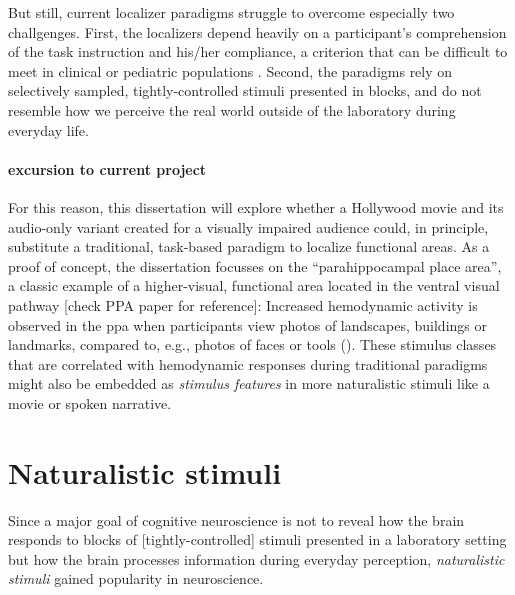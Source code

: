 But still, current localizer paradigms struggle to overcome especially two
challgenges.
%
First, the localizers depend heavily on a participant's comprehension of the
task instruction and his/her compliance, a criterion that can be difficult to
meet in clinical or pediatric populations \citep{eickhoff2020towards,
vanderwal2015inscapes, vanderwal2019movies}.
Second, the paradigms rely on selectively sampled, tightly-controlled stimuli
presented in blocks, and do not resemble how we perceive the real world outside
of the laboratory during everyday life.


\paragraph{excursion to current project}



%
For this reason, this dissertation will explore whether a Hollywood movie and
its audio-only variant created for a visually impaired audience could, in
principle, substitute a traditional, task-based paradigm to localize functional
areas.
%
As a proof of concept, the dissertation focusses on the ``parahippocampal place
area'', a classic example of a higher-visual, functional area
\citep{epstein1998ppa, epstein1999parahippocampal} located in the ventral visual
pathway [check PPA paper for reference]:
Increased hemodynamic activity is observed in the \ac{ppa} when participants
view photos of landscapes, buildings or landmarks, compared to, e.g., photos of
faces or tools (\citep[see reviews][]{epstein2014neural, aminoff2013role}).
%
These stimulus classes that are correlated with hemodynamic responses during
traditional paradigms might also be embedded as \textit{stimulus features} in
more naturalistic stimuli like a movie or spoken narrative.


\section{Naturalistic stimuli}
%
Since a major goal of cognitive neuroscience is not to reveal how the brain
responds to blocks of [tightly-controlled] stimuli presented in a laboratory
setting but how the brain processes information during everyday perception,
\textit{naturalistic stimuli} gained popularity in neuroscience.


